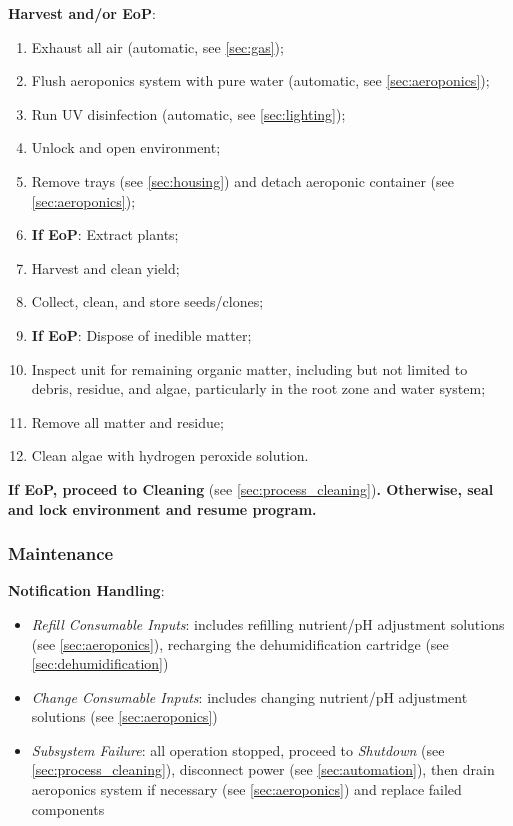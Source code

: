 \clearpage

\textbf{Harvest and/or EoP}:
\begin{enumerate}
    \item Exhaust all air (automatic, see \ref{sec:gas});
    \item Flush aeroponics system with pure water (automatic, see \ref{sec:aeroponics});
    \item Run UV disinfection (automatic, see \ref{sec:lighting});
    \item Unlock and open environment;
    \item Remove trays (see \ref{sec:housing}) and detach aeroponic container (see \ref{sec:aeroponics});
    \item \textbf{If EoP}: Extract plants;
    \item Harvest and clean yield;
    \item Collect, clean, and store seeds/clones;
    \item \textbf{If EoP}: Dispose of inedible matter;
    \item Inspect unit for remaining organic matter, including but not limited to debris, residue, and algae, particularly in the root zone and water system;
    \item Remove all matter and residue;
    \item Clean algae with hydrogen peroxide solution.
\end{enumerate}

\textbf{If EoP, proceed to Cleaning} (see \ref{sec:process_cleaning})\textbf{. Otherwise, seal and lock environment and resume program.}

\subsubsection{Maintenance}
\label{sec:process_maintenance}

\textbf{Notification Handling}:
\begin{itemize}
    \item \textit{Refill Consumable Inputs}: includes refilling nutrient/pH adjustment solutions (see \ref{sec:aeroponics}), recharging the dehumidification cartridge (see \ref{sec:dehumidification})
    \item \textit{Change Consumable Inputs}: includes changing nutrient/pH adjustment solutions (see \ref{sec:aeroponics})
    \item \textit{Subsystem Failure}: all operation stopped, proceed to \textit{Shutdown} (see \ref{sec:process_cleaning}), disconnect power (see \ref{sec:automation}), then drain aeroponics system if necessary (see \ref{sec:aeroponics}) and replace failed components
\end{itemize}

